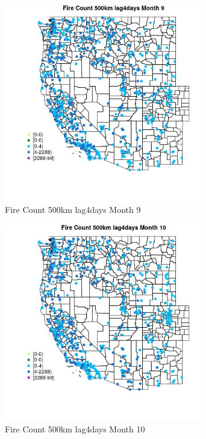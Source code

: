 \begin{figure} 
\centering  
\includegraphics[width=0.77\textwidth]{Code_Outputs/Report_ML_input_PM25_Step4_part_e_de_duplicated_aves_compiled_2019-05-21wNAs_MapObsMo9Fire_Count_500km_lag4days.jpg} 
\caption{\label{fig:Report_ML_input_PM25_Step4_part_e_de_duplicated_aves_compiled_2019-05-21wNAsMapObsMo9Fire_Count_500km_lag4days}Fire Count 500km lag4days Month 9} 
\end{figure} 
 

\clearpage 

\begin{figure} 
\centering  
\includegraphics[width=0.77\textwidth]{Code_Outputs/Report_ML_input_PM25_Step4_part_e_de_duplicated_aves_compiled_2019-05-21wNAs_MapObsMo10Fire_Count_500km_lag4days.jpg} 
\caption{\label{fig:Report_ML_input_PM25_Step4_part_e_de_duplicated_aves_compiled_2019-05-21wNAsMapObsMo10Fire_Count_500km_lag4days}Fire Count 500km lag4days Month 10} 
\end{figure} 
 

